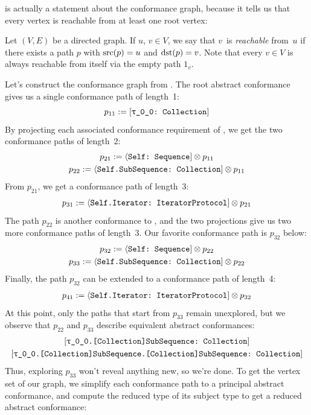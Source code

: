 \documentclass[../generics]{subfiles}
\begin{document}
 is actually a statement about the conformance graph, because it tells us that every vertex is reachable from at least one root vertex:
\begin{definition}
Let $(V, E)$ be a directed graph. If $u$, $v\in V$, we say that $v$~is \emph{reachable} from~$u$ if there exists a path $p$ with $\operatorname{src}(p)=u$ and $\operatorname{dst}(p)=v$. Note that every $v\in V$ is always reachable from itself via the empty path $1_v$.
\end{definition}

\begin{example}\label{conformance graph example}
Let's construct the conformance graph from . The root abstract conformance gives us a single conformance path of length~1:
\[p_{11} := \ConfReq{\rT}{Collection}\]
By projecting each associated conformance requirement of \tCollection, we get the two conformance paths of length~2:
\begin{gather*}
p_{21} := \langle\texttt{Self:~Sequence}]\otimes p_{11}\\
p_{22} := \langle\texttt{Self.SubSequence:~Collection}]\otimes p_{11}
\end{gather*}
From $p_{21}$, we get a conformance path of length~3:
\begin{gather*}
p_{31} := \langle\texttt{Self.Iterator:~IteratorProtocol}] \otimes p_{21}
\end{gather*}
The path $p_{22}$ is another conformance to \tCollection, and the two projections give us two more conformance paths of length~3. Our favorite conformance path is $p_{32}$ below:
\begin{gather*}
p_{32} := \langle\texttt{Self:~Sequence}]\otimes p_{22}\\
p_{33} := \langle\texttt{Self.SubSequence:~Collection}]\otimes p_{22}
\end{gather*}
Finally, the path $p_{32}$ can be extended to a conformance path of length~4:
\begin{gather*}
p_{41} := \langle\texttt{Self.Iterator:~IteratorProtocol}] \otimes p_{32}
\end{gather*}
At this point, only the paths that start from $p_{33}$ remain unexplored, but we observe that $p_{22}$ and $p_{33}$ describe equivalent abstract conformances:
\begin{gather*}
\ConfReq{\rT.[Collection]SubSequence}{Collection}\\
\ConfReq{\rT.[Collection]SubSequence.[Collection]SubSequence}{Collection}
\end{gather*}
Thus, exploring $p_{33}$ won't reveal anything new, so we're done. To get the vertex set of our graph, we simplify each conformance path to a principal abstract conformance, and compute the reduced type of its subject type to get a reduced abstract conformance:

\end{example}
\end{document}
